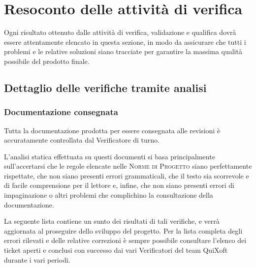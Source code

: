 \documentclass[11pt,a4paper]{article}
\begin{document}
\section{Resoconto delle attività di verifica}
Ogni risultato ottenuto dalle attività di verifica, validazione e qualifica dovrà essere attentamente elencato in questa sezione, in modo da assicurare che tutti i problemi e le relative soluzioni siano tracciate per garantire la massima qualità possibile del prodotto finale.
\subsection{Dettaglio delle verifiche tramite analisi}
\subsubsection{Documentazione consegnata}
Tutta la documentazione prodotta per essere consegnata alle revisioni è accuratamente controllata dal Verificatore di turno.

L'analisi statica effettuata su questi documenti si basa principalmente sull'accertarsi che le regole elencate nelle \textsc{Norme di Progetto} siano perfettamente rispettate, che non siano presenti errori grammaticali, che il testo sia scorrevole e di facile comprensione per il lettore e, infine, che non siano presenti errori di impaginazione o altri problemi che complichino la consultazione della documentazione.

La seguente lista contiene un sunto dei risultati di tali verifiche, e verrà aggiornata al proseguire dello sviluppo del progetto.
Per la lista completa degli errori rilevati e delle relative correzioni è sempre possibile consultare l'elenco dei ticket aperti e conclusi con successo dai vari Verificatori del team QuiXoft durante i vari periodi.
\end{document}
